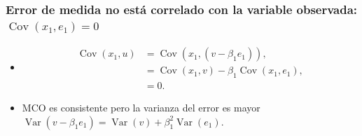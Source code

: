 \documentclass[t, compress, spanish, aspectratio=169]{beamer}
\DeclareMathOperator{\Var}{Var}
\DeclareMathOperator{\Cov}{Cov}
\begin{document}
%
%


\begin{frame}
    \frametitle{Error de medida no est\'a correlado con la variable observada: $\Cov(x_{1},e_{1})=0$}
    \begin{itemize}  
    	\item[]
            \begin{align*}
                \Cov(x_{1}, u) &=\Cov(x_{1}, (v-\beta_1 e_{1})),\\
                               &=\Cov(x_{1},v)-\beta_1 \Cov(x_{1},e_{1}),\\
                               &=0.
            \end{align*}
            \item MCO es \alert{consistente pero la varianza del error es mayor} $\Var(v-\beta_1 e_{1})=\Var(v)+\beta_1^2 \Var(e_{1})$.
\end{itemize}
\end{frame}
%
%
%
\end{document}
